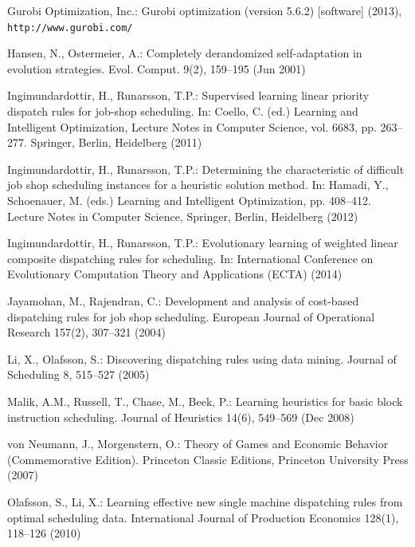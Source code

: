 \documentclass[smallextended]{llncs}
\begin{document}
 
 
 
\begin{thebibliography}{10}
	\providecommand{\url}[1]{\texttt{#1}}
	\providecommand{\urlprefix}{URL }
	
	{Gurobi Optimization, Inc.}: Gurobi optimization (version 5.6.2) [software]
	(2013), \url{http://www.gurobi.com/}
	
	Hansen, N., Ostermeier, A.: Completely derandomized self-adaptation in
	evolution strategies. Evol. Comput.  9(2),  159--195 (Jun 2001)
	
	Ingimundardottir, H., Runarsson, T.P.: Supervised learning linear priority
	dispatch rules for job-shop scheduling. In: Coello, C. (ed.) Learning and
	Intelligent Optimization, Lecture Notes in Computer Science, vol. 6683, pp.
	263--277. Springer, Berlin, Heidelberg (2011)
	
	Ingimundardottir, H., Runarsson, T.P.: Determining the characteristic of
	difficult job shop scheduling instances for a heuristic solution method. In:
	Hamadi, Y., Schoenauer, M. (eds.) Learning and Intelligent Optimization, pp.
	408--412. Lecture Notes in Computer Science, Springer, Berlin, Heidelberg
	(2012)
	
	Ingimundardottir, H., Runarsson, T.P.: Evolutionary learning of weighted linear
	composite dispatching rules for scheduling. In: International Conference on
	Evolutionary Computation Theory and Applications (ECTA) (2014)
	
	Jayamohan, M., Rajendran, C.: Development and analysis of cost-based
	dispatching rules for job shop scheduling. European Journal of Operational
	Research  157(2),  307--321 (2004)
	
	Li, X., Olafsson, S.: Discovering dispatching rules using data mining. Journal
	of Scheduling  8,  515--527 (2005)
	
	Malik, A.M., Russell, T., Chase, M., Beek, P.: Learning heuristics for basic
	block instruction scheduling. Journal of Heuristics  14(6),  549--569 (Dec
	2008)
	
	von Neumann, J., Morgenstern, O.: Theory of Games and Economic Behavior
	(Commemorative Edition). Princeton Classic Editions, Princeton University
	Press (2007)
	
	Olafsson, S., Li, X.: Learning effective new single machine dispatching rules
	from optimal scheduling data. International Journal of Production Economics
	128(1),  118--126 (2010)
	

\end{thebibliography}
\end{document}
